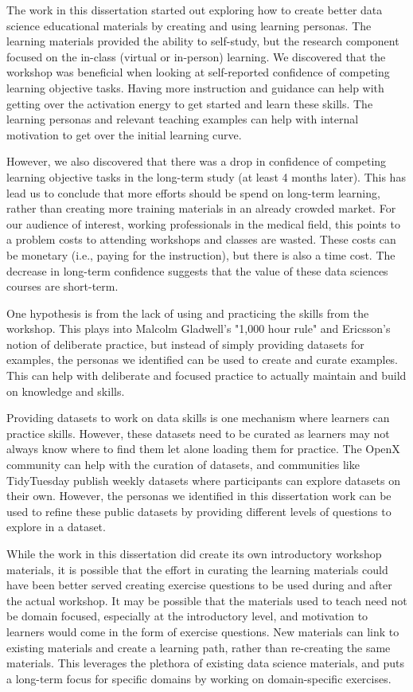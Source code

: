 \documentclass[../main.tex]{subfiles}
\begin{document}
The work in this dissertation started out exploring how to create better data science educational materials
by creating and using learning personas.
The learning materials provided the ability to self-study,
but the research component focused on the in-class (virtual or in-person) learning.
We discovered that the workshop was beneficial when looking at self-reported confidence of competing learning objective tasks.
Having more instruction and guidance can help with getting over the activation energy to get started and learn these skills.
The learning personas and relevant teaching examples can help with internal motivation
to get over the initial learning curve.

However, we also discovered that there was a drop in confidence of competing learning objective tasks
in the long-term study (at least 4 months later).
This has lead us to conclude that more efforts should be spend on long-term learning,
rather than creating more training materials in an already crowded market.
For our audience of interest, working professionals in the medical field,
this points to a problem costs to attending workshops and classes are wasted.
These costs can be monetary (i.e., paying for the instruction), but there is also a time cost.
The decrease in long-term confidence suggests that the value of these data sciences courses are short-term.

One hypothesis is from the lack of using and practicing the skills from the workshop.
This plays into Malcolm Gladwell's "1,000 hour rule" and Ericsson's notion of deliberate practice,
but instead of simply providing datasets for examples,
the personas we identified can be used to create and curate examples.
This can help with deliberate and focused practice to actually maintain and build on knowledge and skills.

Providing datasets to work on data skills is one mechanism where learners can practice skills.
However, these datasets need to be curated as learners may not always know where to find them let alone loading them for practice.
The OpenX community can help with the curation of datasets,
and communities like TidyTuesday publish weekly datasets where participants can explore datasets on their own.
However, the personas we identified in this dissertation work can be used to refine these public datasets
by providing different levels of questions to explore in a dataset.

While the work in this dissertation did create its own introductory workshop materials,
it is possible that the effort in curating the learning materials could have been better served creating exercise questions
to be used during and after the actual workshop.
It may be possible that the materials used to teach need not be domain focused,
especially at the introductory level,
and motivation to learners would come in the form of exercise questions.
New materials can link to existing materials and create a learning path,
rather than re-creating the same materials.
This leverages the plethora of existing data science materials,
and puts a long-term focus for specific domains by working on domain-specific exercises.
\end{document}
